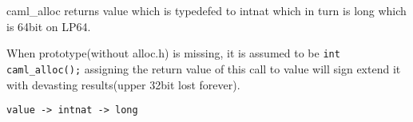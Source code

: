 



caml\_alloc returns value which is typedefed to intnat which in turn
is long which is 64bit on LP64. 

When prototype(without alloc.h) is missing, it is assumed to be
\verb|int caml_alloc();| assigning the return value of this call to
value will sign extend it with devasting results(upper 32bit lost
forever).


\verb|value -> intnat -> long|

